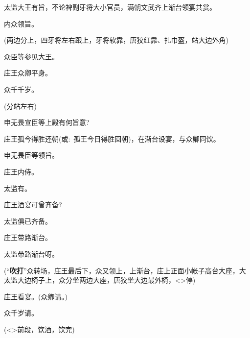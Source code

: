 {太监\hspace{30pt}大王有旨，不论裨副牙将大小官员，满朝文武齐上渐台领宴共赏。

内众\hspace{30pt}领旨。

({\hwfs 两边分上}，{\hwfs 四}牙将{\hwfs 左右跟上}，牙将软靠，唐狡红靠、扎巾盔，{\hwfs 站大边外角})

众\hspace{40pt}臣等参见大王。

庄王\hspace{30pt}众卿平身。

众\hspace{40pt}千千岁。

({\hwfs 分站左右})

申无畏\hspace{20pt}宣臣等上殿有何旨意?

庄王\hspace{30pt}孤今得胜还朝({\akai 或}:~孤王今日得胜回朝)，在渐台设宴，与众卿同饮。

申无畏\hspace{20pt}臣等领旨。

庄王\hspace{30pt}内侍。

太监\hspace{30pt}有。

庄王\hspace{30pt}酒宴可曾齐备?

太监\hspace{30pt}俱已齐备。

庄王\hspace{30pt}带路渐台。

太监\hspace{30pt}带路渐台呀。

\vspace{5pt}

(``{\bfseries\akai 吹打}''众{\hwfs 转场}，庄王{\hwfs 最后下}，众{\hwfs 又领上}，{\hwfs 上渐台}，庄{\hwfs 上正面小帐子高台大座}，大太监{\hwfs 大边椅子上}，众{\hwfs 分坐两边大座}，{\hwfs 唐狡坐大边最外椅}，\textless{}\!\textgreater{}{\hwfs 停})

庄王\hspace{30pt}看宴。(众卿请。)

众\hspace{40pt}千岁请。

(\textless{}\!\textgreater{}前段，{\hwfs 饮酒}，{\hwfs 饮完})

}
